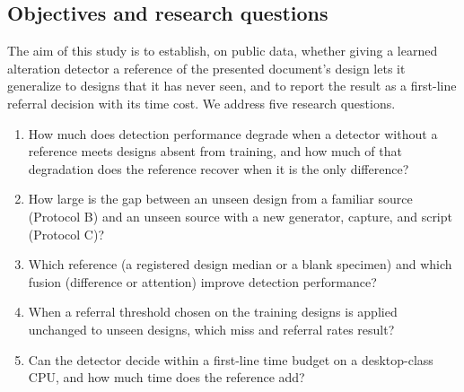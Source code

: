 \documentclass[12pt,a4paper]{article}
\begin{document}
\subsection{Objectives and research questions}
The aim of this study is to establish, on public data, whether giving a learned alteration detector a reference of the presented document's design lets it generalize to designs that it has never seen, and to report the result as a first-line referral decision with its time cost. We address five research questions.
\begin{enumerate}[label=\textbf{RQ\arabic*.}]
  \item How much does detection performance degrade when a detector without a reference meets designs absent from training, and how much of that degradation does the reference recover when it is the only difference?
  \item How large is the gap between an unseen design from a familiar source (Protocol B) and an unseen source with a new generator, capture, and script (Protocol C)?
  \item Which reference (a registered design median or a blank specimen) and which fusion (difference or attention) improve detection performance?
  \item When a referral threshold chosen on the training designs is applied unchanged to unseen designs, which miss and referral rates result?
  \item Can the detector decide within a first-line time budget on a desktop-class CPU, and how much time does the reference add?
\end{enumerate}
\end{document}
